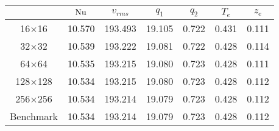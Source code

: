 \begin{tabular}{c|cccccc}
    & $\mathrm{Nu}$ & $v_{rms}$ & $q_1$ & $q_2$ & $T_{e}$ & $z_{e}$ \\
\hline
16$\times$16 & 10.570 & 193.493 & 19.105 & 0.722 & 0.431 & 0.111 \\
32$\times$32 & 10.539 & 193.222 & 19.081 & 0.722 & 0.428 & 0.114 \\
64$\times$64 & 10.535 & 193.215 & 19.080 & 0.723 & 0.428 & 0.111 \\
128$\times$128 & 10.534 & 193.215 & 19.080 & 0.723 & 0.428 & 0.112 \\
256$\times$256 & 10.534 & 193.214 & 19.079 & 0.723 & 0.428 & 0.112 \\
\hline
Benchmark & 10.534 & 193.214 & 19.079 & 0.723 & 0.428 & 0.112 \\
\end{tabular}
